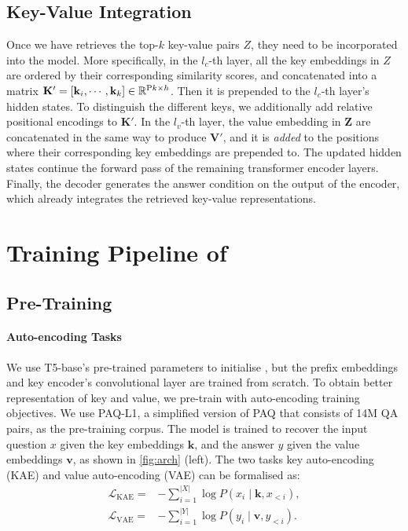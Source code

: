 \subsection{Key-Value Integration} \label{sec:integration}


Once we have retrieves the top-$k$ key-value pairs $Z$, they need to be incorporated into the model. 
More specifically, in the $l_c$-th layer, all the key embeddings in $Z$ are ordered by their corresponding similarity scores, and concatenated into a matrix $\mathbf{K}'=[\mathbf{k}_i, \cdots, \mathbf{k}_k] \in \mathbb{R}^{\textup{P} k \times h}$.
Then it is prepended to the $l_c$-th layer's hidden states.
To distinguish the different keys, we additionally add relative positional encodings to $\mathbf{K}'$.
In the $l_v$-th layer, the value embedding in $\mathbf{Z}$ are concatenated in the same way to produce $\mathbf{V}'$, and it is \emph{added} to the positions where their corresponding key embeddings are prepended to.
The updated hidden states continue the forward pass of the remaining transformer encoder layers.
Finally, the decoder generates the answer condition on the output of the encoder, which already integrates the retrieved key-value representations.



\section{Training Pipeline of \ModelName} \label{sec:pipeline}

\subsection{Pre-Training} \label{sec:pretrain}


\paragraph{Auto-encoding Tasks}
We use T5-base's pre-trained parameters to initialise \ModelName, but the prefix embeddings and key encoder's convolutional layer are trained from scratch.
To obtain better representation of key and value, we pre-train \ModelName with auto-encoding training objectives. We use PAQ-L1, a simplified version of PAQ that consists of 14M QA pairs, as the pre-training corpus.
The model is trained to recover the input question $x$ given the key embeddings $\mathbf{k}$, and the answer $y$ given the value embeddings $\mathbf{v}$, as shown in \cref{fig:arch} (left).
The two tasks key auto-encoding (KAE) and value auto-encoding (VAE) can be formalised as:
\begin{equation*}
\begin{aligned}
\mathcal{L}_{\text{KAE}} = & - \sum_{i=1}^{|X|}  \log P(x_i \mid \mathbf{k}, x_{<i}), \\
\mathcal{L}_{\text{VAE}} = & - \sum_{i=1}^{|Y|}  \log P(y_i \mid \mathbf{v}, y_{<i}).
\end{aligned}
\end{equation*}


